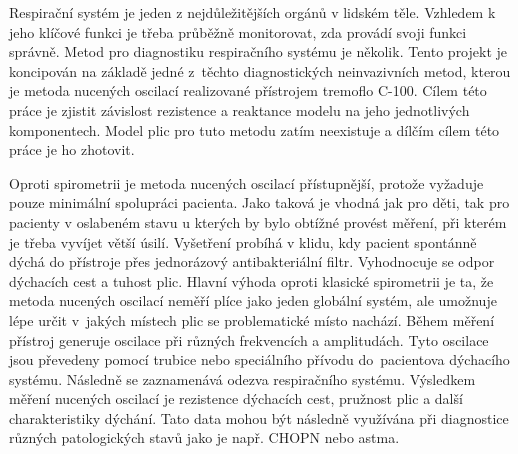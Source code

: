 Respirační systém je jeden z nejdůležitějších orgánů v lidském těle. Vzhledem k jeho klíčové funkci je třeba průběžně monitorovat, zda provádí svoji funkci správně. 
Metod pro diagnostiku respiračního systému je několik. Tento projekt je koncipován na základě jedné z~těchto diagnostických neinvazivních metod, kterou je metoda nucených oscilací realizované přístrojem tremoflo C-100. Cílem této práce je zjistit závislost rezistence a reaktance modelu na jeho jednotlivých komponentech. \cite{Vlcek2018}
Model plic pro tuto metodu zatím neexistuje a dílčím cílem této práce je ho zhotovit. 


Oproti spirometrii je metoda nucených oscilací přístupnější, protože vyžaduje pouze minimální spolupráci pacienta. Jako taková je vhodná jak pro děti, tak pro pacienty v oslabeném stavu u kterých by bylo obtížné provést měření, při kterém je třeba vyvíjet větší úsilí. \cite{Vlcek2018} Vyšetření probíhá v klidu, kdy pacient spontánně dýchá do přístroje přes jednorázový antibakteriální filtr. Vyhodnocuje se odpor dýchacích cest a tuhost plic. \cite{Vlcek2018}
Hlavní výhoda oproti klasické spirometrii je ta, že metoda nucených oscilací neměří plíce jako jeden globální systém, ale umožnuje lépe určit v~jakých místech plic se problematické místo nachází. \cite{Vlcek2018}
Během měření přístroj generuje oscilace při různých frekvencích a amplitudách. Tyto oscilace jsou převedeny pomocí trubice nebo speciálního přívodu do~pacientova dýchacího systému. Následně se zaznamenává odezva respiračního systému. Výsledkem měření nucených oscilací je rezistence dýchacích cest, pružnost plic a další charakteristiky dýchání. Tato data mohou být následně využívána při diagnostice různých patologických stavů jako je např. CHOPN nebo astma. \cite{Vlcek2018}
